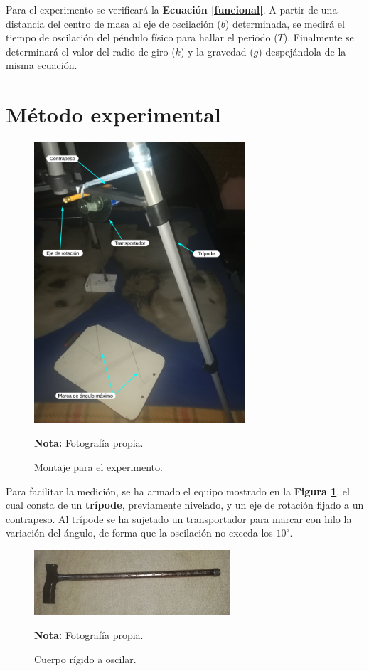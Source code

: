 \documentclass[letter,11pt]{article}
\newcommand{\source}[1]{\vspace{-11pt} \caption*{\small{\textbf{Nota:} {#1}}}}
\begin{document}
Para el experimento se verificará la \textbf{Ecuación \ref{funcional}}. A partir
de una distancia del centro de masa al eje de oscilación ($b$) determinada, se
medirá el tiempo de oscilación del péndulo físico para hallar el periodo ($T$).
Finalmente se determinará el valor del radio de giro ($k$) y la gravedad ($g$)
despejándola de la misma ecuación.

\section{Método experimental}

\begin{figure}
\centering
\includegraphics[width=0.70\textwidth]{resources/f2.eps}
\caption{Montaje para el experimento.}
\label{figura2}
\source{Fotografía propia.}
\end{figure}

Para facilitar la medición, se ha armado el equipo mostrado en la
\textbf{Figura \ref{figura2}}, el cual consta de un \textbf{trípode},
previamente nivelado, y un eje de rotación fijado a un contrapeso. Al trípode se
ha sujetado un transportador para marcar con hilo la variación del ángulo, de
forma que la oscilación no exceda los $10^\circ$.

\begin{figure}
\centering
\includegraphics[width=0.65\textwidth]{resources/f3.eps}
\caption{Cuerpo rígido a oscilar.}
\label{figura3}
\source{Fotografía propia.}
\end{figure}
\end{document}
